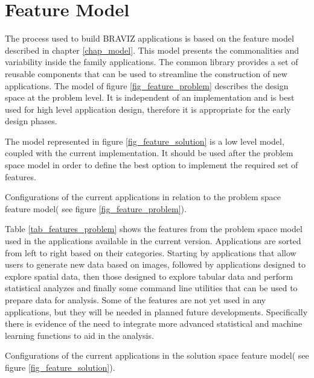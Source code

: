 \section{Feature Model}


The process used to build BRAVIZ applications is based on the feature model described in chapter \ref{chap_model}. This model presents the commonalities and variability inside the family applications. The common library provides a set of reusable components that can be used to streamline the construction of new applications. The model of figure \ref{fig_feature_problem} describes the design space at the problem level. It is independent of an implementation and is best used for high level application design, therefore it is appropriate for the early design phases. 

The model represented in figure \ref{fig_feature_solution} is a low level model, coupled with the current implementation. It should be used after the problem space model in order to define the best option to implement the required set of features. 

\begin{table}
\scriptsize
	
\caption{\label{tab_features_problem} Configurations of the current applications in relation to the problem space feature model( see figure \ref{fig_feature_problem}).}
\end{table}

Table \ref{tab_features_problem} shows the features from the problem space model used in the applications available in the current version. Applications are sorted from left to right based on their categories. Starting by applications that allow users to generate new data based on images, followed by applications designed to explore spatial data, then those designed to explore tabular data and perform statistical analyzes and finally some command line utilities that can be used to prepare data for analysis. Some of the features are not yet used in any applications, but they will be needed in planned future developments. Specifically there is evidence of the need to integrate more advanced statistical and machine learning functions to aid in the analysis. 

\begin{table}
\scriptsize
	
\caption{ \label{tab_features_solution} Configurations of the current applications in the solution space feature model( see figure \ref{fig_feature_solution}).}
\end{table}

